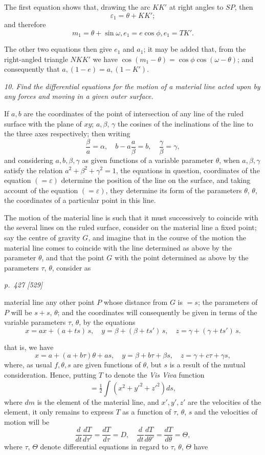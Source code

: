 \documentclass[11pt,a4paper]{article}
\theoremstyle{plain}
\theoremstyle{definition}
\begin{document}
The first equation shows that, drawing the arc $KK'$ at right angles to $SP$, then
\[
\varepsilon_1 = \theta + KK';
\]
and therefore
\[
m_1 = \theta + \sin\omega, e_1 = e\cos\phi, e_1 = TK'.
\]

The other two equations then give $e_1$ and $a_1$; it may be added that, from the
right-angled triangle $NKK'$ we have $\cos(m_1 - \theta) = \cos\phi\cos(\omega - \theta)$; and consequently
that $a, (1 - e) = a, (1 - K')$.

\textit{10. Find the differential equations for the motion of a material line acted upon by any forces and moving in a given outer surface.}

If $a, b$ are the coordinates of the point of intersection of any line of the ruled
surface with the plane of $xy$; $a, \beta$, $\gamma$ the cosines of the inclinations of the line to
the three axes respectively; then writing
\[
\frac{\beta}{a} = \alpha,\quad b - a\frac{a}{\beta} = b,\quad \frac{\gamma}{\beta} = \gamma,
\]
and considering $a, b, \beta, \gamma$ as given functions of a variable parameter $\theta$, when
$a, \beta, \gamma$ satisfy the relation $a^2 + \beta^2 + \gamma^2 = 1$, the equations in question, coordinates of the
equation $(=\varepsilon)$ determine the position of the line on the surface, and taking account of the
equation $(=\varepsilon)$, they determine its form of the parameters $\theta$, $\theta$, the coordinates of a
particular point in this line.

The motion of the material line is such that it must successively to coincide with
the several lines on the ruled surface, consider on the material line a fixed point;
say the centre of gravity $G$, and imagine that in the course of the motion the material
line comes to coincide with the line determined as above by the parameter $\theta$, and that
the point $G$ with the point determined as above by the parameters $\tau$, $\theta$, consider as
\clearpage

\bigskip
\textit{p.~427 [529]}
\smallskip

material line any other point $P$ whose distance from $G$ is $= s$; the parameters of $P$
will be $s + s$, $\theta$; and the coordinates will consequently be given in terms of the variable
parameters $\tau$, $\theta$, by the equations
\[
x = ax + (a + ts)\,s,\quad y = \beta + (\beta + ts')\,s,\quad z = \gamma + (\gamma + ts')\,s.
\]

that is, we have
\[
x = a + (a + b\tau)\theta + as,\quad y = \beta + b\tau + \beta s,\quad z = \gamma + c\tau + \gamma s,
\]
where, as usual $f, \theta, s$ are given functions of $\theta$, but $s$ is a result of the mutual
consideration. Hence, putting $T$ to denote the \textit{Vis Viva} function
\[
= \tfrac{1}{2}\int (x^2 + y'^2 + z'^2) ds,
\]
where $dm$ is the element of the material line, and $x', y', z'$ are the velocities of the
element, it only remains to express $T$ as a function of $\tau$, $\theta$, $s$ and the velocities of
motion will be
\[
\frac{d}{dt}\frac{dT}{d\tau'} = \frac{dT}{d\tau} = D,\quad \frac{d}{dt}\frac{dT}{d\theta'} = \frac{dT}{d\theta} = \Theta,
\]
where $\tau$, $\Theta$ denote differential equations in regard to $\tau$, $\theta$, $\Theta$ have
\end{document}
